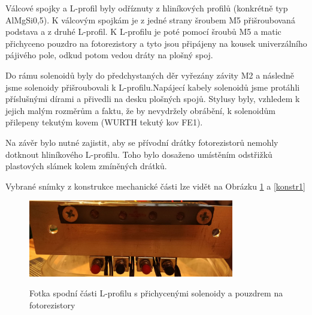 \documentclass[12pt,oneside]{book} %
\begin{document}
\qquad Válcové spojky a L-profil byly odříznuty z hliníkových profilů (konkrétně typ AlMgSi0,5). K válcovým spojkám je z jedné strany šroubem M5 přišroubovaná podstava a z druhé L-profil. K L-profilu je poté pomocí šroubů M5 a matic přichyceno pouzdro na fotorezistory a tyto jsou připájeny na kousek univerzálního pájivého pole, odkud potom vedou dráty na plošný spoj. 

\qquad Do rámu solenoidů byly do předchystaných děr vyřezány závity M2 a následně jsme solenoidy přišroubovali k L-profilu.Napájecí kabely solenoidů jsme protáhli příslušnými dírami a přivedli na desku plošných spojů. Stylusy byly, vzhledem k jejich malým rozměrům a faktu, že by nevydržely obrábění, k solenoidům přilepeny tekutým kovem (WURTH tekutý kov FE1).

\qquad Na závěr bylo nutné zajistit, aby se přívodní drátky fotorezistorů nemohly dotknout hliníkového L-profilu. Toho bylo dosaženo umístěním odstřižků plastových slámek kolem zmíněných drátků. 

\qquad Vybrané snímky z konstrukce mechanické části lze vidět na Obrázku \ref{konstr0} a \ref{konstr1}

\begin{figure}[ht] \large\centering
\includegraphics[width=0.80\textwidth]{./img/konstr0.png}\\[1cm] 
\caption{Fotka spodní části L-profilu s přichycenými solenoidy a pouzdrem na fotorezistory}
\label{konstr0}
\end{figure} 
\end{document}
